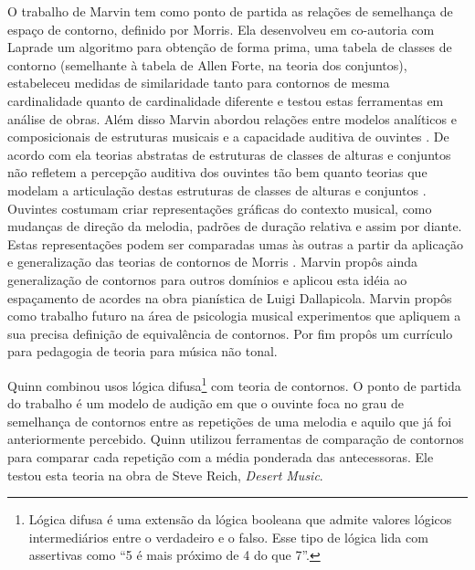 \documentclass[12pt]{article}
\newcommand{\opus}[1]{\textit{#1}}
\begin{document}
O trabalho de Marvin tem como ponto de partida as relações de
semelhança de espaço de contorno, definido por Morris. Ela desenvolveu
em co-autoria com Laprade \cite{marvin.ea87:relating} um algoritmo
para obtenção de forma prima, uma tabela de classes de contorno
(semelhante à tabela de Allen Forte, na teoria dos conjuntos),
estabeleceu medidas de similaridade tanto para contornos de mesma
cardinalidade quanto de cardinalidade diferente e testou estas
ferramentas em análise de obras. Além disso Marvin abordou relações
entre modelos analíticos e composicionais de estruturas musicais e a
capacidade auditiva de ouvintes \cite{marvin88:generalized}. De acordo
com ela teorias abstratas de estruturas de classes de alturas e
conjuntos não refletem a percepção auditiva dos ouvintes tão bem
quanto teorias que modelam a articulação destas estruturas de classes
de alturas e conjuntos \cite[p. 228]{marvin88:generalized}. Ouvintes
costumam criar representações gráficas do contexto musical, como
mudanças de direção da melodia, padrões de duração relativa e assim
por diante. Estas representações podem ser comparadas umas às outras a
partir da aplicação e generalização das teorias de contornos de Morris
\cite[p. 229]{marvin88:generalized}. Marvin propôs ainda generalização
de contornos para outros domínios e aplicou esta idéia ao espaçamento
de acordes na obra pianística de Luigi Dallapicola. Marvin propôs como
trabalho futuro na área de psicologia musical experimentos que
apliquem a sua precisa definição de equivalência de contornos. Por fim
propôs um currículo para pedagogia de teoria para música não tonal.



Quinn \cite{quinn97:fuzzy} combinou usos lógica difusa\footnote{Lógica
  difusa é uma extensão da lógica booleana que admite valores lógicos
  intermediários entre o verdadeiro e o falso. Esse tipo de lógica
  lida com assertivas como ``5 é mais próximo de 4 do que 7''.} com
teoria de contornos. O ponto de partida do trabalho é um modelo de
audição em que o ouvinte foca no grau de semelhança de contornos entre
as repetições de uma melodia e aquilo que já foi anteriormente
percebido. Quinn utilizou ferramentas de comparação de contornos para
comparar cada repetição com a média ponderada das antecessoras. Ele
testou esta teoria na obra de Steve Reich, \opus{Desert Music}.

\end{document}
